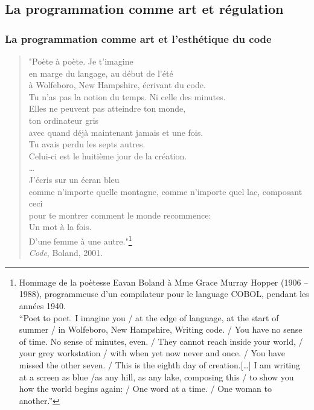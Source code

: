 \subsection{La programmation comme art et régulation} \label{2.3.1}

\subsubsection{La programmation comme art et l'esthétique du code} \label{2.3.1.a}

{\footnotesize \begin{verse} \begin{flushright}
"Poète à poète. Je t'imagine\\
en marge du langage, au début de l'été\\
à Wolfeboro, New Hampshire, écrivant du code.\\
Tu n'as pas la notion du temps. Ni celle des minutes.\\
Elles ne peuvent pas atteindre ton monde,\\
ton ordinateur gris\\
avec quand déjà maintenant jamais et une fois.\\
Tu avais perdu les septs autres.\\
Celui-ci est le huitième jour de la création.\\
\ldots\\
\newpage
J'écris sur un écran bleu\\
comme n'importe quelle montagne, comme n'importe quel lac, composant ceci\\
pour te montrer comment le monde recommence:\\
Un mot à la fois.\\
D'une femme à une autre."\footnote{Hommage de la poètesse Eavan Boland à Mme Grace Murray Hopper (1906 -- 1988), programmeuse d'un compilateur pour le language COBOL, pendant les années 1940.\\ “Poet to poet. I imagine you / at the edge of language, at the start of summer / in Wolfeboro, New Hampshire, Writing code. / You have no sense of time. No sense of minutes, even. / They cannot reach inside your world, / your grey workstation / with when yet now never and once. / You have missed the other seven. / This is the eighth day of creation.[…] I am writing at a screen as blue /as any hill, as any lake, composing this / to show you how the world begins again: / One word at a time. / One woman to another.”}\\
\emph{Code}, Boland, 2001.
\end{flushright} \end{verse} }

